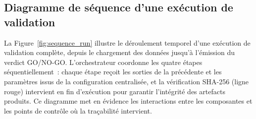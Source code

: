 \subsection{Diagramme de séquence d'une exécution de validation}

La Figure~\ref{fig:sequence_run} illustre le déroulement temporel d'une exécution de validation
complète, depuis le chargement des données jusqu'à l'émission du verdict GO/NO-GO.
L'orchestrateur coordonne les quatre étapes séquentiellement~: chaque étape reçoit les
sorties de la précédente et les paramètres issus de la configuration centralisée, et la
vérification SHA-256 (ligne rouge) intervient en fin d'exécution pour garantir l'intégrité
des artefacts produits. Ce diagramme met en évidence les interactions entre les
composantes et les points de contrôle où la traçabilité intervient.

